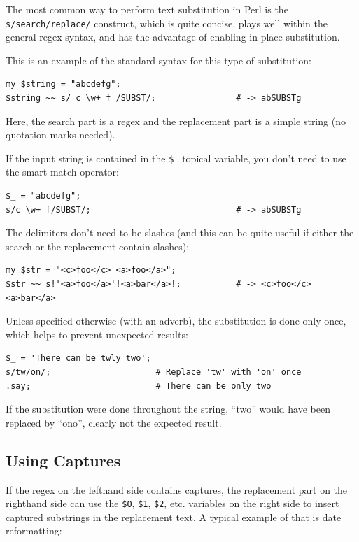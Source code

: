 The most common way to perform text substitution 
in Perl is the \verb's/search/replace/' construct, which 
is quite concise, plays well within the general regex syntax, 
and has the advantage of enabling in-place substitution.

This is an example of the standard syntax for this type 
of substitution:

\begin{verbatim}
my $string = "abcdefg";
$string ~~ s/ c \w+ f /SUBST/;                # -> abSUBSTg
\end{verbatim}

Here, the search part is a regex and the replacement 
part is a simple string (no quotation marks needed).

If the input string is contained in the \verb'$_' topical variable,
you don't  need to use the smart match operator:

\begin{verbatim}
$_ = "abcdefg";
s/c \w+ f/SUBST/;                             # -> abSUBSTg
\end{verbatim}
%

The delimiters don't need to be slashes (and this can be quite 
useful if either the search or the replacement contain slashes):

\begin{verbatim}
my $str = "<c>foo</c> <a>foo</a>";
$str ~~ s!'<a>foo</a>'!<a>bar</a>!;           # -> <c>foo</c> <a>bar</a>
\end{verbatim}
%

Unless specified otherwise (with an adverb), the substitution 
is done only once, which helps to prevent unexpected results:

\begin{verbatim}
$_ = 'There can be twly two';
s/tw/on/;                     # Replace 'tw' with 'on' once
.say;                         # There can be only two
\end{verbatim}
%
If the substitution were done throughout the string, ``two'' 
would have been replaced by ``ono'', clearly not the expected 
result.

\subsection{Using Captures}

If the regex on the lefthand side contains captures, the 
replacement part on the righthand side can use the \verb'$O', 
\verb'$1', \verb'$2', etc. variables on the right side to insert 
captured substrings in the replacement text. A typical 
example of that is date reformatting:

